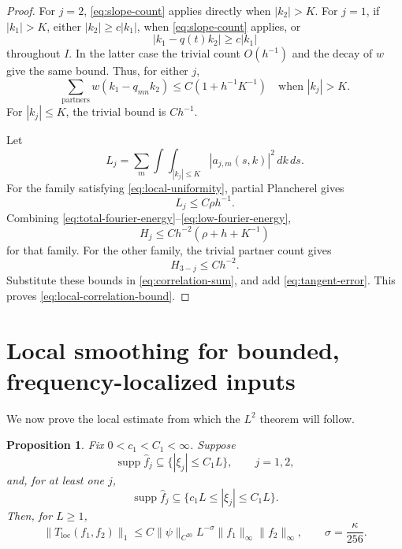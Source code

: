 \documentclass[11pt,a4paper]{article}
\DeclareMathOperator{\supp}{supp}
\newtheorem{proposition}[lemma]{Proposition}
\begin{document}
\begin{proof}
For $j=2$, \eqref{eq:slope-count} applies directly when $|k_2|>K$. For
$j=1$, if $|k_1|>K$, either $|k_2|\geq c|k_1|$, when
\eqref{eq:slope-count} applies, or
\[
|k_1-q(t)k_2|\geq c|k_1|
\]
throughout $I$. In the latter case the trivial count $O(h^{-1})$ and the
decay of $w$ give the same bound. Thus, for either $j$,
\[
\sum_{\text{partners}}w(k_1-q_{mn}k_2)
\leq C(1+h^{-1}K^{-1})\quad\text{when }|k_j|>K.
\tag{5.14}\label{eq:high-slope-count}
\]
For $|k_j|\leq K$, the trivial bound is $Ch^{-1}$.

Let
\[
L_j=\sum_m\int\!\!\int_{|k_j|\leq K}|a_{j,m}(s,k)|^2\,dk\,ds.
\]
For the family satisfying \eqref{eq:local-uniformity}, partial Plancherel
gives
\[
L_j\leq C\rho h^{-1}.
\tag{5.15}\label{eq:low-fourier-energy}
\]
Combining \eqref{eq:total-fourier-energy}--\eqref{eq:low-fourier-energy},
\[
H_j\leq Ch^{-2}(\rho+h+K^{-1})
\]
for that family. For the other family, the trivial partner count gives
\[
H_{3-j}\leq Ch^{-2}.
\]
Substitute these bounds in \eqref{eq:correlation-sum}, and add
\eqref{eq:tangent-error}. This proves \eqref{eq:local-correlation-bound}.
\end{proof}

\section{Local smoothing for bounded, frequency-localized inputs}

We now prove the local estimate from which the $L^2$ theorem will follow.

\begin{proposition}\label{prop:local-smoothing}
Fix $0<c_1<C_1<\infty$. Suppose
\[
\supp\widehat f_j\subseteq\{|\xi_j|\leq C_1L\},\qquad j=1,2,
\]
and, for at least one $j$,
\[
\supp\widehat f_j\subseteq\{c_1L\leq|\xi_j|\leq C_1L\}.
\]
Then, for $L\geq1$,
\[
\|T_{\mathrm{loc}}(f_1,f_2)\|_1
\leq C\|\psi\|_{C^{20}}L^{-\sigma}
\|f_1\|_\infty\|f_2\|_\infty,
\qquad\sigma=\frac{\kappa}{256}.
\tag{6.1}\label{eq:local-smoothing}
\]
\end{proposition}
\end{document}
